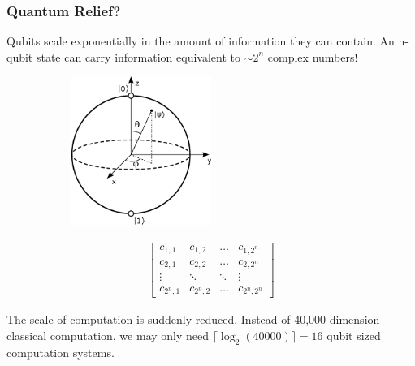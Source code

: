 \begin{frame}
    \frametitle{Quantum Relief?}

    Qubits scale exponentially in the amount of information they can contain. An
    n-qubit state can carry information equivalent to \(\sim 2^n\) complex numbers!

    \pause

    \begin{figure}
        \centering
        \begin{subfigure}{0.45\textwidth}
            \centering
            \includegraphics[width=0.5\textwidth]{figures/blochsphere.png}
        \end{subfigure}
        \pause
        \begin{subfigure}{0.45\textwidth}
            \centering
            \begin{gather*}
                \begin{bmatrix}
                    c_{1,1} & c_{1,2} & \ldots & c_{1,2^n} \\
                    c_{2,1} & c_{2,2} & \ldots & c_{2,2^n} \\
                    \vdots & \ddots & \ddots & \vdots \\
                    c_{2^n,1} & c_{2^n,2} & \ldots & c_{2^n,2^n}
                \end{bmatrix}
            \end{gather*}
        \end{subfigure}
    \end{figure}

    \pause

    The scale of computation is suddenly reduced. Instead of 40,000 dimension
    classical computation, we may only need \(\lceil{\log_2 (40000)}\rceil = 16\)
    qubit sized computation systems.

\end{frame}

